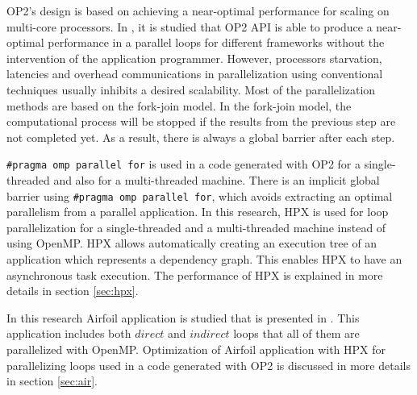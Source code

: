\documentclass[conference]{IEEEtran}
\begin{document}
OP2's design is based on achieving a near-optimal performance for scaling on multi-core processors. In \cite{o3,o4}, it is studied that OP2 API is able to produce a near-optimal performance in a parallel loops for different frameworks without the intervention of the application programmer. However, processors starvation, latencies and overhead communications in parallelization using conventional techniques usually inhibits a desired scalability. Most of the parallelization methods are based on the fork-join model. In the fork-join model, the computational process will be stopped if the results from the previous step are not completed yet. As a result, there is always a global barrier after each step. 

\texttt{\#pragma omp parallel for} is used in a code generated with OP2 for a single-threaded and also for a multi-threaded machine. There is an implicit global barrier using \texttt{\#pragma omp parallel for}, which avoids extracting an optimal parallelism from a parallel application. In this research, HPX is used for loop parallelization for a single-threaded and a multi-threaded machine instead of using OpenMP.  HPX allows automatically creating an execution tree of an application which represents a dependency graph. This enables HPX to have an asynchronous task execution. The performance of HPX is explained in more details in section \ref{sec:hpx}.                                                                                                                                                                                                                                                                                                                                                                                                                                                                                                                                                                                                                                                                                                                                                                                                                            


In this research Airfoil application is studied that is presented in \cite{o8}. This application includes both $direct$ and $indirect$ loops that all of them are parallelized with OpenMP. Optimization of Airfoil application with HPX for parallelizing loops used in a code generated with OP2 is discussed in more details in section \ref{sec:air}.                                                                                                                                                                                                                                      
\end{document}
